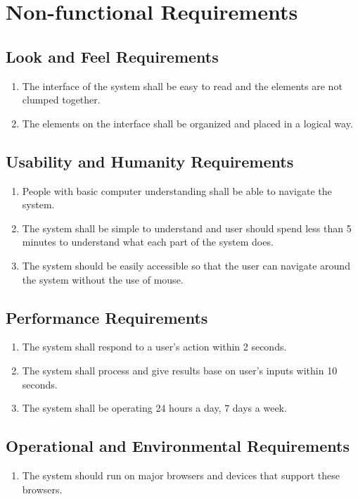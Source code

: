 \documentclass[12pt, titlepage]{article}
\begin{document}
\section{Non-functional Requirements}

\subsection{Look and Feel Requirements}
\begin{enumerate}[label=NFR.\arabic*]
    \item The interface of the system shall be easy to read and the elements are not clumped together.
    \item The elements on the interface shall be organized and placed in a logical way.
\end{enumerate}

\subsection{Usability and Humanity Requirements}
\begin{enumerate}[label=NFR.\arabic*, resume]
    \item People with basic computer understanding shall be able to navigate the system.
    \item The system shall be simple to understand and user should spend less than 5 minutes to understand what each part of the system does. 
    \item The system should be easily accessible so that the user can navigate around the system without the use of mouse.
\end{enumerate}
\subsection{Performance Requirements}
\begin{enumerate}[label=NFR.\arabic*, resume]
    \item The system shall respond to a user's action within 2 seconds.
    \item The system shall process and give results base on user's inputs within 10 seconds.
    \item The system shall be operating 24 hours a day, 7 days a week.
\end{enumerate}
\subsection{Operational and Environmental Requirements}
\begin{enumerate}[label=NFR.\arabic*, resume]
    \item The system should run on major browsers and devices that support these browsers.
\end{enumerate}
\end{document}
